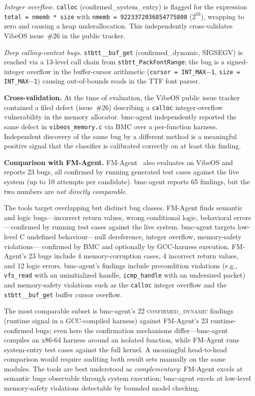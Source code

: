 \documentclass[11pt,a4paper]{article}
\newcommand{\tool}{bmc-agent\xspace}
\newcommand{\fmagent}{FM-Agent\xspace}
\newcommand{\vibeos}{VibeOS\xspace}
\newcommand{\dynconf}{\textsc{confirmed\_dynamic}\xspace}
\begin{document}
\emph{Integer overflow.}
\texttt{calloc} (confirmed\_system\_entry) is flagged for the expression
\texttt{total = nmemb * size} with \texttt{nmemb = 9223372036854775808}
($2^{63}$), wrapping to zero and causing a heap underallocation. This
independently cross-validates \vibeos issue~\#26 in the public tracker.

\emph{Deep calling-context bugs.}
\texttt{stbtt\_\_buf\_get} (confirmed\_dynamic, SIGSEGV) is reached via
a 13-level call chain from \texttt{stbtt\_PackFontRange}; the bug is a
signed-integer overflow in the buffer-cursor arithmetic (\texttt{cursor =
INT\_MAX$-$1}, \texttt{size = INT\_MAX$-$1}) causing out-of-bounds reads
in the TTF font parser.

\noindent\textbf{Cross-validation.} At the time of evaluation, the \vibeos
public issue tracker contained a filed defect (issue~\#26) describing a
\texttt{calloc} integer-overflow vulnerability in the memory allocator.
\tool independently reported the same defect in
\texttt{vibeos\_memory.c} via BMC over a per-function harness. Independent
discovery of the same bug by a different method is a meaningful positive
signal that the classifier is calibrated correctly on at least this finding.

\noindent\textbf{Comparison with FM-Agent.}
\fmagent~\cite{fmagent} also evaluates on \vibeos and reports 23 bugs,
all confirmed by running generated test cases against the live system
(up to 10 attempts per candidate). \tool reports 65 findings, but the
two numbers are \emph{not directly comparable}.

The tools target overlapping but distinct bug classes.
\fmagent finds semantic and logic bugs---incorrect return values, wrong
conditional logic, behavioral errors---confirmed by running test cases
against the live system. \tool targets low-level C undefined
behaviour---null dereference, integer overflow, memory-safety violations---
confirmed by BMC and optionally by GCC-harness execution.
\fmagent's 23 bugs include 4 memory-corruption cases, 4 incorrect return
values, and 12 logic errors. \tool's findings include precondition
violations (e.g., \texttt{vfs\_read} with an uninitialized handle,
\texttt{icmp\_handle} with an undersized packet) and memory-safety
violations such as the \texttt{calloc} integer overflow and the
\texttt{stbtt\_\_buf\_get} buffer cursor overflow.

The most comparable subset is \tool's 22 \dynconf findings (runtime signal
in a GCC-compiled harness) against \fmagent's 23 runtime-confirmed bugs;
even here the confirmation mechanisms differ---\tool compiles an x86-64
harness around an isolated function, while \fmagent runs system-entry test
cases against the full kernel. A meaningful head-to-head comparison would
require auditing both result sets manually on the same modules. The tools
are best understood as \emph{complementary}: \fmagent excels at semantic
bugs observable through system execution; \tool excels at low-level
memory-safety violations detectable by bounded model checking.
\end{document}
